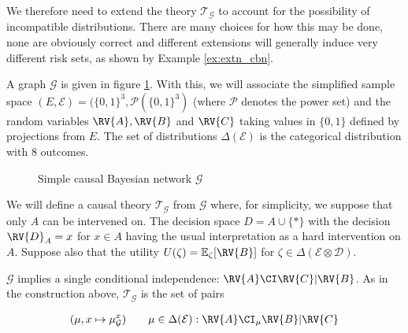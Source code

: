 We therefore need to extend the theory $\mathscr{T}_{\mathcal{G}}$ to account for the possibility of incompatible distributions. There are many choices for how this may be done, none are obviously correct and different extensions will generally induce very different risk sets, as shown by Example \ref{ex:extn_cbn}.

\begin{example}\label{ex:extn_cbn}

A graph $\mathcal{G}$ is given in figure \ref{fig:simple_cbn}. With this, we will associate the simplified sample space $(E,\mathcal{E})=(\{0,1\}^3,\mathscr{P}(\{0,1\}^3)$ (where $\mathscr{P}$ denotes the power set) and the random variables $\RV{A},\RV{B}$ and $\RV{C}$ taking values in $\{0,1\}$ defined by projections from $E$. The set of distributions $\Delta(\mathcal{E})$ is the categorical distribution with 8 outcomes.

\begin{figure}
    \centering
    \caption{Simple causal Bayesian network $\mathcal{G}$}
    \label{fig:simple_cbn}
\end{figure}

We will define a causal theory $\mathscr{T}_{\mathcal{G}}$ from $\mathcal{G}$ where, for simplicity, we suppose that only $A$ can be intervened on. The decision space $D=A\cup\{*\}$ with the decision $\RV{D}_A=x$ for $x\in A$ having the usual interpretation as a hard intervention on $A$. Suppose also that the utility $U(\zeta)=\mathbb{E}_{\zeta}[\RV{B}]$ for $\zeta\in\Delta(\mathcal{E}\otimes\mathcal{D})$.

$\mathcal{G}$ implies a single conditional independence: $\RV{A}\CI \RV{C} | \RV{B}$. As in the construction above, $\mathscr{T}_{\mathcal{G}}$ is the set of pairs

\begin{align}
    (\mu,x\mapsto \mu_{\mathcal{G}}^x ) \qquad \mu\in\Delta(\mathcal{E}):\RV{A}\CI_{\mu}\RV{B}|\RV{C} \label{eq:ocbn}
\end{align}


\end{example}
